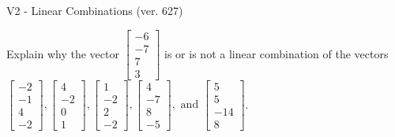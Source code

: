 \begin{exercise}
  \begin{exerciseTitle}V2 - Linear Combinations (ver. 627)\end{exerciseTitle}
  \begin{exerciseStatement}
    Explain why the vector \(\left[\begin{array}{c}
-6 \\
-7 \\
7 \\
3
\end{array}\right]\)  is or is not a linear 
	combination of the vectors \(\left[\begin{array}{c}
-2 \\
-1 \\
4 \\
-2
\end{array}\right] , \left[\begin{array}{c}
4 \\
-2 \\
0 \\
1
\end{array}\right] , \left[\begin{array}{c}
1 \\
-2 \\
2 \\
-2
\end{array}\right] , \left[\begin{array}{c}
4 \\
-7 \\
8 \\
-5
\end{array}\right] , \text{ and } \left[\begin{array}{c}
5 \\
5 \\
-14 \\
8
\end{array}\right]\).
	



\end{exerciseStatement}
\end{exercise}
